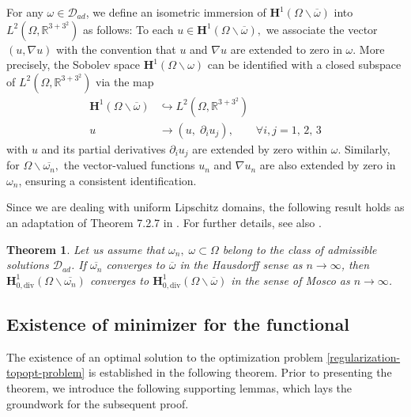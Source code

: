 \documentclass[a4paper,12pt,reqno,natbib]{amsart}
\newtheorem{theorem}{Theorem}
\def\H{\textbf{H}}
\begin{document}
For any $\omega \in \mathcal{D}_{ad}$, we define an isometric immersion of $\H^1(\Omega \backslash \overline{\omega})$ into $L^2\left(\Omega, \mathbb{R}^{3+3^2}\right)$ as follows: To each $u \in \H^1(\Omega \backslash \overline{\omega}),$ we associate the vector $(u, \nabla u)$ with the convention that $u$ and $\nabla u$ are extended to zero in $\omega$. More precisely, the Sobolev space $\H^1(\Omega \backslash \omega)$ can be identified with a closed subspace of $L^2\left(\Omega, \mathbb{R}^{3+3^2}\right)$ via the map
\begin{equation}\label{identified}
\begin{aligned}
\H^1(\Omega \backslash \overline{\omega}) & \hookrightarrow L^2\left(\Omega, \mathbb{R}^{3+3^2}\right) \\
u & \rightarrow\left(u,\; \partial_i u_j\right), \quad\quad \forall i, j=1,\,2,\, 3
\end{aligned}
\end{equation}
with $u$ and its partial derivatives $\partial_i u_j$ are extended by zero within $\omega.$ Similarly, for $\Omega \backslash \overline{\omega_n},$ the vector-valued functions $u_n$ and $\nabla u_n$ are also extended by zero in $\omega_n$, ensuring a consistent identification.


Since we are dealing with uniform Lipschitz domains, the following result holds as an adaptation of Theorem 7.2.7 in \cite{BucurBook2005}. For further details, see also \cite{HenrotBook2005}.

\begin{theorem}\label{Mosco-convergence-Sobolev}
 Let us assume that $\omega_n,\; \omega \subset \Omega$ belong to the class of admissible solutions $\mathcal{D}_{ad}$. If $\overline{\omega_n}$ converges to $\overline{\omega}$ in the Hausdorff sense as $n\to\infty$, then $\H^1_{0,\text{div}}(\Omega\backslash\overline{\omega_n})$ converges to $\H^1_{0,\text{div}}(\Omega\backslash\overline{\omega})$ in the sense of Mosco  as $n\to\infty$.
\end{theorem}


\subsection{Existence of minimizer for the functional}

The existence of an optimal solution to the optimization problem \eqref{regularization-topopt-problem} is established in the following theorem. Prior to presenting the theorem, we introduce the following supporting lemmas, which lays the groundwork for the subsequent proof.
\end{document}
